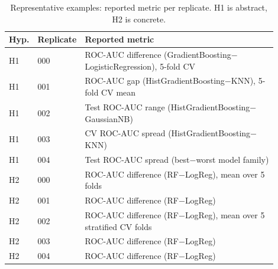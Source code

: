 \documentclass{article}
\begin{document}
\begin{table}[h]
  \caption{Representative examples: reported metric per replicate. H1 is abstract, H2 is
  concrete.}
  \label{tab:examples}
  \centering
  \footnotesize
  \begin{tabular}{p{0.06\linewidth}p{0.1\linewidth}p{0.74\linewidth}}
    \toprule
    Hyp. & Replicate & Reported metric \\
    \midrule
    H1 & 000 & ROC-AUC difference (GradientBoosting$-$LogisticRegression), 5-fold CV \\
    H1 & 001 & ROC-AUC gap (HistGradientBoosting$-$KNN), 5-fold CV mean \\
    H1 & 002 & Test ROC-AUC range (HistGradientBoosting$-$GaussianNB) \\
    H1 & 003 & CV ROC-AUC spread (HistGradientBoosting$-$KNN) \\
    H1 & 004 & Test ROC-AUC spread (best$-$worst model family) \\
    H2 & 000 & ROC-AUC difference (RF$-$LogReg), mean over 5 folds \\
    H2 & 001 & ROC-AUC difference (RF$-$LogReg) \\
    H2 & 002 & ROC-AUC difference (RF$-$LogReg), mean over 5 stratified CV folds \\
    H2 & 003 & ROC-AUC difference (RF$-$LogReg) \\
    H2 & 004 & ROC-AUC difference (RF$-$LogReg) \\
    \bottomrule
  \end{tabular}
\end{table}
\end{document}
